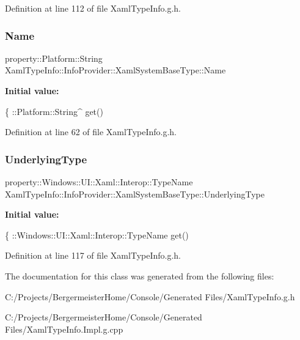 Definition at line 112 of file Xaml\+Type\+Info.\+g.\+h.

\mbox{\label{class_xaml_type_info_1_1_info_provider_1_1_xaml_system_base_type_a44a6de0d0294e11103802d36c7a28d1f}} 
\subsubsection{\texorpdfstring{Name}{Name}}
{\footnotesize\ttfamily property\+::\+Platform\+::\+String Xaml\+Type\+Info\+::\+Info\+Provider\+::\+Xaml\+System\+Base\+Type\+::\+Name}

{\bfseries Initial value\+:}
\begin{DoxyCode}
\{
                ::Platform::String^ \textcolor{keyword}{get}()
\end{DoxyCode}


Definition at line 62 of file Xaml\+Type\+Info.\+g.\+h.

\mbox{\label{class_xaml_type_info_1_1_info_provider_1_1_xaml_system_base_type_abb659fe4aaa303e5309dd48ca3cfc45a}} 
\subsubsection{\texorpdfstring{Underlying\+Type}{UnderlyingType}}
{\footnotesize\ttfamily property\+::\+Windows\+::\+U\+I\+::\+Xaml\+::\+Interop\+::\+Type\+Name Xaml\+Type\+Info\+::\+Info\+Provider\+::\+Xaml\+System\+Base\+Type\+::\+Underlying\+Type}

{\bfseries Initial value\+:}
\begin{DoxyCode}
\{
                ::Windows::UI::Xaml::Interop::TypeName \textcolor{keyword}{get}()
\end{DoxyCode}


Definition at line 117 of file Xaml\+Type\+Info.\+g.\+h.



The documentation for this class was generated from the following files\+:\begin{DoxyCompactItemize}
\item 
C\+:/\+Projects/\+Bergermeister\+Home/\+Console/\+Generated Files/Xaml\+Type\+Info.\+g.\+h\item 
C\+:/\+Projects/\+Bergermeister\+Home/\+Console/\+Generated Files/Xaml\+Type\+Info.\+Impl.\+g.\+cpp\end{DoxyCompactItemize}
